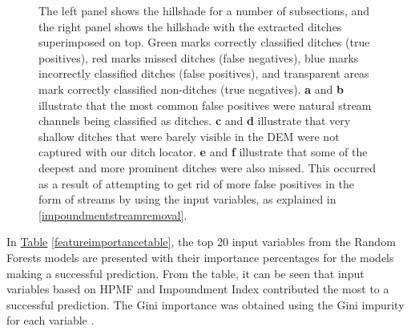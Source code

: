 \documentclass[]{interact}
\theoremstyle{plain}%
\theoremstyle{definition}
\theoremstyle{remark}
\begin{document}
\begin{figure} [!htb]
    \caption{The left panel shows the hillshade for a number of subsections, and the right panel shows the hillshade with the extracted ditches superimposed on top. Green marks correctly classified ditches (true positives), red marks missed ditches (false negatives), blue marks incorrectly classified ditches (false positives), and transparent areas mark correctly classified non-ditches (true negatives). \textbf{a} and \textbf{b} illustrate that the most common false positives were natural stream channels being classified as ditches. \textbf{c} and \textbf{d} illustrate that very shallow ditches that were barely visible in the DEM were not captured with our ditch locator. \textbf{e} and \textbf{f} illustrate that some of the deepest and more prominent ditches were also missed. This occurred as a result of attempting to get rid of more false positives in the form of streams by using the input variables, as explained in \ref{impoundmentstreamremoval}.}
    \label{fig:resultsillustrations}
\end{figure}
\clearpage

In \hyperref[featureimportancetable]{Table} \ref{featureimportancetable}, the top 20 input variables from the Random Forests models are presented with their importance percentages for the models making a successful prediction. From the table, it can be seen that input variables based on HPMF and Impoundment Index contributed the most to a successful prediction. The Gini importance was obtained using the Gini impurity for each variable \citep{gini}.
\end{document}
